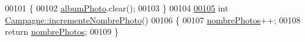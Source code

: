 \begin{DoxyCode}
00101 \{
00102     \hyperlink{class_campagne_a4d1fc7d4dbf10868a297fe3df7f08dbf}{albumPhoto}.clear();
00103 \}
00104 
\hyperlink{class_campagne_ab6a893a28bc18e054d2d19d2671ce6da}{00105} \textcolor{keywordtype}{int} \hyperlink{class_campagne_ab6a893a28bc18e054d2d19d2671ce6da}{Campagne::incrementeNombrePhoto}()
00106 \{
00107     \hyperlink{class_campagne_a3696e02e3cefc30bf4f284152917718b}{nombrePhotos}++;
00108     \textcolor{keywordflow}{return} \hyperlink{class_campagne_a3696e02e3cefc30bf4f284152917718b}{nombrePhotos};
00109 \}
\end{DoxyCode}
